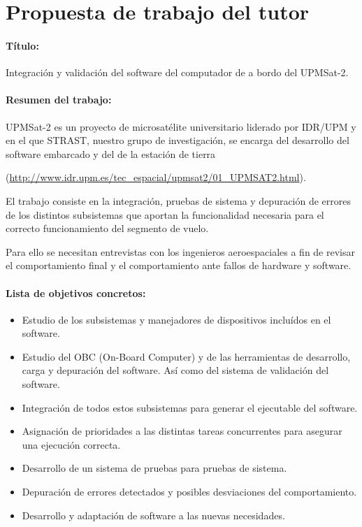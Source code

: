 
\section{Propuesta de trabajo del tutor}

\paragraph{Título:}
Integración y validación del software del computador de a bordo del UPMSat-2.

\paragraph{Resumen del trabajo:}
UPMSat-2 es un proyecto de microsatélite universitario liderado por IDR/UPM y en
el que STRAST, nuestro grupo de investigación, se encarga del desarrollo del
software embarcado y del de la estación de tierra

(\url{http://www.idr.upm.es/tec\_espacial/upmsat2/01\_UPMSAT2.html}).

El trabajo consiste en la integración, pruebas de sistema y depuración de
errores de los distintos subsistemas que aportan la funcionalidad necesaria
para el correcto funcionamiento del segmento de vuelo.

Para ello se necesitan entrevistas con los ingenieros aeroespaciales a fin
de revisar el comportamiento final y el comportamiento ante fallos de hardware
y software.

\paragraph{Lista de objetivos concretos:}
\begin{itemize}
\item Estudio de los subsistemas y manejadores de dispositivos incluídos
  en el software.
\item Estudio del OBC (On-Board Computer) y de las herramientas de desarrollo,
  carga y depuración del software. Así como del sistema de validación
  del software.
\item Integración de todos estos subsistemas para generar el ejecutable
  del software.
\item Asignación de prioridades a las distintas tareas concurrentes para
  asegurar una ejecución correcta.
\item Desarrollo de un sistema de pruebas para pruebas de sistema.
\item Depuración de errores detectados y posibles desviaciones del
  comportamiento.
\item Desarrollo y adaptación de software a las nuevas necesidades.
\end{itemize}

